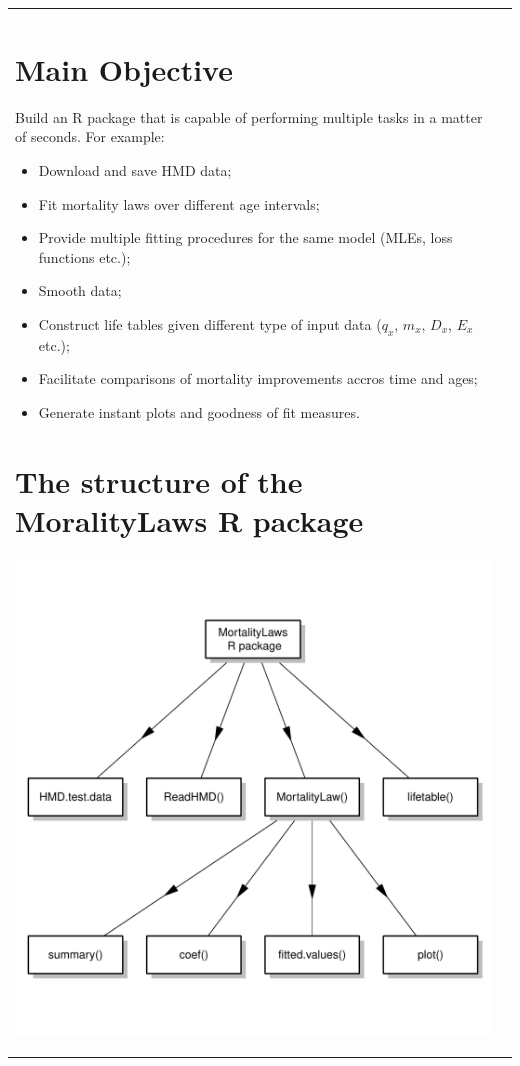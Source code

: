 \documentclass[a0,portrait]{a0poster}\usepackage[]{graphicx}\usepackage[]{color}
\newenvironment{knitrout}{}{} %
\begin{document}
\begin{tabular}{ l  l }
\begin{minipage}[t]{0.45\textwidth}
  \section*{Main Objective}
  \large
   Build an R package that is capable of performing multiple tasks in a matter of seconds. For example:
  \begin{itemize}
  \item Download and save HMD data;
  \item Fit mortality laws over different age intervals;
  \item Provide multiple fitting procedures for the same model (MLEs, loss functions etc.);
  \item Smooth data;
  \item Construct life tables given different type of input data ($q_x$, $m_x$, $D_x$, $E
  _x$ etc.);
  \item Facilitate comparisons of mortality improvements accros time and ages;
  \item Generate instant plots and goodness of fit measures.
  \end{itemize}
  
  
  \section*{The structure of the MoralityLaws R package}
\begin{knitrout}
\definecolor{shadecolor}{rgb}{0.969, 0.969, 0.969}\color{fgcolor}

{\centering \includegraphics[width=0.75\linewidth]{figure/Diagram-1} 

}



\end{knitrout}
\end{minipage} %

\end{tabular}
\end{document}
